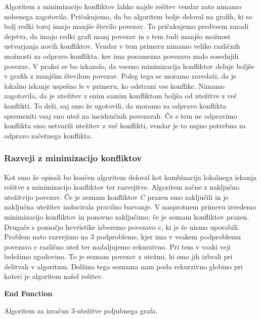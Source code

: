 \documentclass[12pt,a4paper,twoside]{article}
\theoremstyle{definition} %
\theoremstyle{plain} %
\numberwithin{equation}{section}  %
\begin{document}
Algoritem z minimizacijo konfliktov lahko najde rešitev vendar zato nimamo nobenega zagotovila. Pričakujemo, da bo algoritem bolje deloval na grafih, ki so bolj redki torej imajo manjše število povezav. To pričakujemo predvsem zaradi dejstva, da imajo redki grafi manj povezav in s tem tudi manjšo možnost ustvarjanja novih konfliktov. Vendar v tem primeru nimamo veliko različnih možnosti za odpravo konflikta, ker ima posamezna povezava malo sosednjih povezav. V praksi se bo izkazalo, da vseeno minimizacija konfliktov deluje boljše v grafih z manjšim številom povezav. Poleg tega se moramo zavedati, da je lokalno iskanje uspešno le v primeru, ko odstrani vse konflike. Nimamo zagotovila, da je utežitev z enim samim konfliktom boljša od utežitve z več konflikti. To drži, saj smo že ugotovili, da moramo za odpravo konflikta spremeniti vsaj eno utež na incidenčnih povezavah. Če s tem ne odpravimo konflikta smo ustvarili utežitev z več konflikti, vendar je to nujno potrebno za odpravo začetnega konflikta.

\subsubsection{Razveji z minimizacijo konfliktov}

Kot smo že opisali bo končen algoritem deloval kot kombinacija lokalnega iskanja rešitve z minimizacijo konfliktov ter razvejitve. Algoritem začne z naključno utežitvijo povezav. Če je seznam konfliktov $C$ prazen smo zaključili in je naključna utežitev inducirala pravilno barvanje. V nasprotnem primeru izvedemo minimizacijo konfliktov in ponovno zaključimo, če je seznam konfliktov prazen. Drugače s pomočjo hevristike izberemo povezavo $e$, ki je še nismo uporabili. Problem nato razvejimo na $3$ podprobleme, kjer ima v vsakem podproblemu povezava $e$ različno utež ter nadaljujemo rekurzivno. Pri tem v vsaki veji beležimo zgodovino. To je seznam povezav z utežmi, ki smo jih izbrali pri delitvah v algoritmu. Dolžina tega seznama nam poda rekurzivno globino pri kateri je algoritem našel rešitev.

\begin{algorithm}[H]

\textbf{End Function}



 
 \caption{Algoritem za izračun 3-utežitve poljubnega grafa.}
\end{algorithm}
\end{document}
